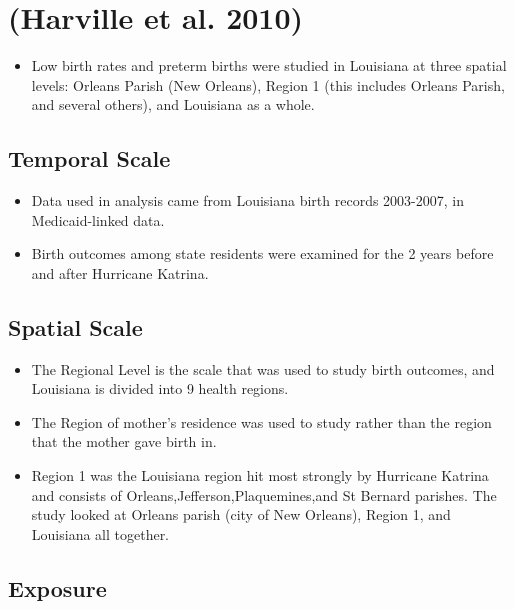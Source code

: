 \documentclass[
]{article}
\providecommand{\tightlist}{%
  \setlength{\itemsep}{0pt}\setlength{\parskip}{0pt}}
\begin{document}
\hypertarget{harville2010population}{%
\section{(Harville et al. 2010)}\label{harville2010population}}

\begin{itemize}
\tightlist
\item
  Low birth rates and preterm births were studied in Louisiana at three
  spatial levels: Orleans Parish (New Orleans), Region 1 (this includes
  Orleans Parish, and several others), and Louisiana as a whole.
\end{itemize}

\hypertarget{temporal-scale-6}{%
\subsection{Temporal Scale}\label{temporal-scale-6}}

\begin{itemize}
\tightlist
\item
  Data used in analysis came from Louisiana birth records 2003-2007, in
  Medicaid-linked data.
\item
  Birth outcomes among state residents were examined for the 2 years
  before and after Hurricane Katrina.
\end{itemize}

\hypertarget{spatial-scale-9}{%
\subsection{Spatial Scale}\label{spatial-scale-9}}

\begin{itemize}
\tightlist
\item
  The Regional Level is the scale that was used to study birth outcomes,
  and Louisiana is divided into 9 health regions.
\item
  The Region of mother's residence was used to study rather than the
  region that the mother gave birth in.
\item
  Region 1 was the Louisiana region hit most strongly by Hurricane
  Katrina and consists of Orleans,Jefferson,Plaquemines,and St Bernard
  parishes. The study looked at Orleans parish (city of New Orleans),
  Region 1, and Louisiana all together.
\end{itemize}

\hypertarget{exposure-3}{%
\subsection{Exposure}\label{exposure-3}}
\end{document}
